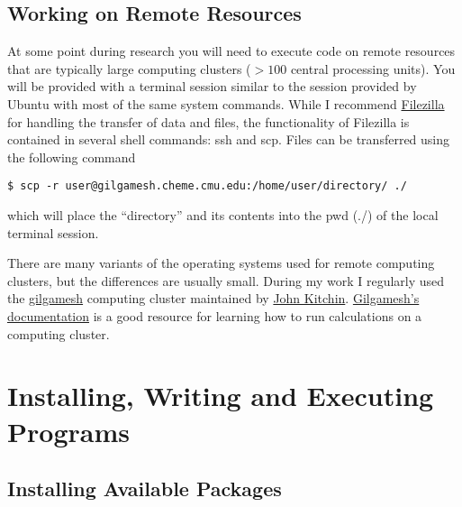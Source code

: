 \subsection{\label{A:Comp_Env:Remote}Working on Remote Resources}

At some point during research you will need to execute code on remote 
resources that are typically large computing clusters ($> 100$ central 
processing units). 
You will be provided with a terminal session similar to the session 
provided by Ubuntu with most of the same system commands. 
While I recommend 
\href{https://filezilla-project.org/}{Filezilla} 
for handling the transfer of data and files, 
the functionality of Filezilla is contained in several shell 
commands: ssh and scp. 
Files can be transferred using the following command
\begin{lstlisting}
$ scp -r user@gilgamesh.cheme.cmu.edu:/home/user/directory/ ./
\end{lstlisting}
which will place the ``directory'' and its contents into the pwd 
(./) of the local terminal session. 

There are many variants of the operating systems used for remote 
computing clusters, but the differences are usually small. 
During my work I regularly used the 
\href{http://gilgamesh.cheme.cmu.edu/doc/gilgamesh.html}
{gilgamesh} computing cluster maintained by 
\href{https://github.com/jkitchin}{John Kitchin}. 
\href{http://gilgamesh.cheme.cmu.edu/doc/gilgamesh.html}
{Gilgamesh's documentation} is a good resource for learning how to run 
calculations on a computing cluster.

\section{\label{A:Comp_Env:Programs}
Installing, Writing and Executing Programs}

\subsection{\label{A:Comp_Env:Install}Installing Available Packages}


